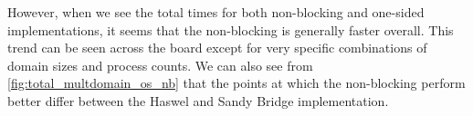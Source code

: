 \begin{enumerate}
	However, when we see the total times for both non-blocking and one-sided implementations, it seems that the non-blocking is generally faster overall.
	This trend can be seen across the board except for very specific combinations of domain sizes and process counts. 
	We can also see from \ref{fig:total_multdomain_os_nb} that the points at which the non-blocking perform better differ between the Haswel and Sandy Bridge implementation.


\end{enumerate}
